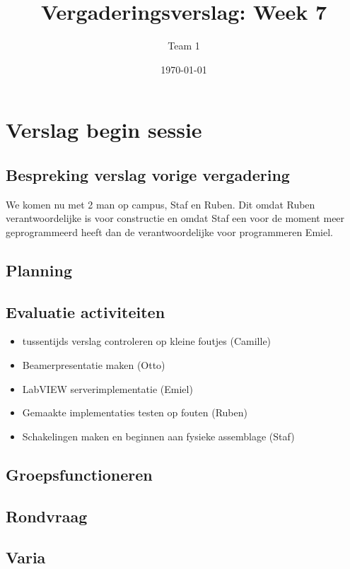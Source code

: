 \documentclass[a4paper,kulak]{kulakarticle} %
\date{\today}
\title{Vergaderingsverslag: Week 7}
\author{Team 1}
\begin{document}
\maketitle

\section{Verslag begin sessie}

\subsection{Bespreking verslag vorige vergadering}
We komen nu met 2 man op campus, Staf en Ruben. Dit omdat Ruben verantwoordelijke is voor constructie en omdat Staf een voor de moment meer geprogrammeerd heeft dan de verantwoordelijke voor programmeren Emiel.
\subsection{Planning}

\subsection{Evaluatie activiteiten}

\begin{itemize}
	\item tussentijds verslag controleren op kleine foutjes (Camille)
	\item Beamerpresentatie maken (Otto)
	\item LabVIEW serverimplementatie (Emiel)
	\item Gemaakte implementaties testen op fouten (Ruben)
	\item Schakelingen maken en beginnen aan fysieke assemblage (Staf)
\end{itemize}

\subsection{Groepsfunctioneren}

\subsection{Rondvraag}

\subsection{Varia}
\end{document}
